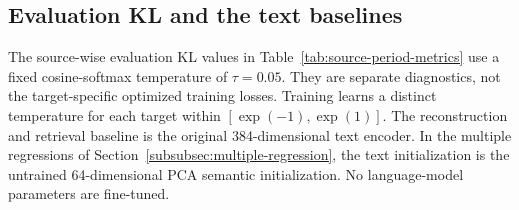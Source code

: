 \documentclass[9pt,twoside]{pnas-new}
\begin{document}
\subsection{Evaluation KL and the text baselines}
The source-wise evaluation KL values in Table~\ref{tab:source-period-metrics} use a fixed cosine-softmax temperature of $\tau=0.05$. They are separate diagnostics, not the target-specific optimized training losses. Training learns a distinct temperature for each target within $[\exp(-1),\exp(1)]$. The reconstruction and retrieval baseline is the original 384-dimensional text encoder. In the multiple regressions of Section~\ref{subsubsec:multiple-regression}, the text initialization is the untrained 64-dimensional PCA semantic initialization. No language-model parameters are fine-tuned.

\clearpage

\end{document}
